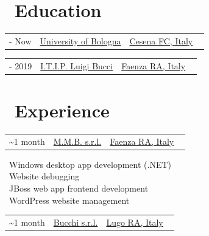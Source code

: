 \documentclass{article}
\makeatletter
\newcommand{\triple}[3]{
    \vspace{-4pt}
    \begin{tabularx}{\textwidth}{@{}>{\raggedright\arraybackslash}X >{\centering\arraybackslash}c >{\raggedleft\arraybackslash}X@{}}
    #1 & #2 & #3
    \end{tabularx}
    \vspace{-16pt}
}
\makeatother
\begin{document}
\begin{paracol}{2}
    \section*{\faGraduationCap \ Education}

    \begin{tcolorbox}[title=\href{https://corsi.unibo.it/1cycle/ComputerScienceEngineering}{Bachelor in Computer Science and Engineering}]
        \triple
            {\faCalendar* 2019 - Now}
            {\href{https://www.unibo.it/en/}{University of Bologna}}
            {\href{https://www.openstreetmap.org/relation/42809}{Cesena FC, Italy} \ \faCity}
    \end{tcolorbox}

    \begin{tcolorbox}[title=High School Diploma in Information Technology]
        \triple
            {\faCalendar* 2014 - 2019}
            {\href{https://www.itipfaenza.edu.it/}{I.T.I.P. Luigi Bucci}}
            {\href{https://www.openstreetmap.org/relation/43004}{Faenza RA, Italy} \ \faCity}
    \end{tcolorbox}

    \vfill

    \section*{\faBriefcase \ Experience}

    \begin{tcolorbox}[title=Software Developer Internship]
        \triple
            {\faCalendar* 2018 \textasciitilde 1 month}
            {\href{https://www.mmbsoftware.it/portalemmb/en/home}{M.M.B. s.r.l.}}
            {\href{https://www.openstreetmap.org/relation/43004}{Faenza RA, Italy} \ \faCity}
        \tcblower

        \faDesktop \ Windows desktop app development (.NET) \\
        \faBug \ Website debugging \\
        \faCoffee \ JBoss web app frontend development \\
        \faWordpress \ WordPress website management
    \end{tcolorbox}

    \begin{tcolorbox}[title=Software Developer Internship]
        \triple
            {\faCalendar* 2018 \textasciitilde 1 month}
            {\href{http://www.bucchi.it/en/}{Bucchi s.r.l.}}
            {\href{https://www.openstreetmap.org/relation/43140}{Lugo RA, Italy} \ \faCity}
        \tcblower


\end{tcolorbox}
\end{paracol}
\end{document}
